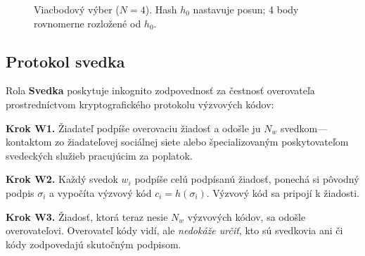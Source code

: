 \documentclass[11pt,a4paper,twocolumn]{article}
\begin{document}
\begin{figure}[ht]
\centering
{}
\caption{Viacbodový výber ($N{=}4$). Hash $h_0$ nastavuje posun; 4 body rovnomerne rozložené od $h_0$.}
\label{fig:multipoint}
\end{figure}

\subsection{Protokol svedka}

Rola \textbf{Svedka} poskytuje inkognito zodpovednosť za čestnosť overovateľa prostredníctvom kryptografického protokolu výzvových kódov:

\textbf{Krok W1.} Žiadateľ podpíše overovaciu žiadosť a odošle ju $N_w$ svedkom---kontaktom zo žiadateľovej sociálnej siete alebo špecializovaným poskytovateľom svedeckých služieb pracujúcim za poplatok.

\textbf{Krok W2.} Každý svedok $w_i$ podpíše celú podpísanú žiadosť, ponechá si pôvodný podpis $\sigma_i$ a vypočíta výzvový kód $c_i = h(\sigma_i)$. Výzvový kód sa pripojí k žiadosti.

\textbf{Krok W3.} Žiadosť, ktorá teraz nesie $N_w$ výzvových kódov, sa odošle overovateľovi. Overovateľ kódy vidí, ale \emph{nedokáže určiť}, kto sú svedkovia ani či kódy zodpovedajú skutočným podpisom.
\end{document}
